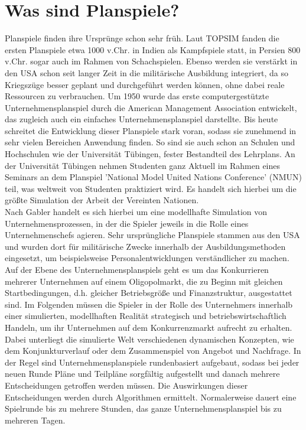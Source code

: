 \section{Was sind Planspiele?}
\label{sec:einleitung-was}

Planspiele finden ihre Ursprünge schon sehr früh. Laut TOPSIM fanden die ersten Planspiele etwa 1000 v.Chr. in Indien als Kampfspiele statt, in Persien 800 v.Chr. sogar auch im Rahmen von Schachspielen.  Ebenso werden sie verstärkt in den USA schon seit langer Zeit in die militärische Ausbildung integriert, da so Kriegszüge besser geplant und durchgeführt werden können, ohne dabei reale Ressourcen zu verbrauchen. Um 1950 wurde das  erste computergestützte Unternehmensplanspiel durch die American Management Association entwickelt, das zugleich auch ein einfaches Unternehmensplanspiel darstellte. Bis heute schreitet die Entwicklung dieser Planspiele stark voran, sodass sie zunehmend in sehr vielen Bereichen Anwendung finden. So sind sie auch schon an Schulen und Hochschulen wie der Universität Tübingen, fester Bestandteil des Lehrplans. An der Universität Tübingen nehmen Studenten ganz Aktuell im Rahmen eines Seminars an dem Planspiel 'National Model United Nations Conference' (NMUN) teil, was weltweit von Studenten praktiziert wird. Es handelt sich hierbei um die größte Simulation der Arbeit der Vereinten Nationen.
\\ 
Nach Gabler handelt es sich hierbei um eine modellhafte Simulation von Unternehmensprozessen, in der die Spieler jeweils in die Rolle eines Unternehmenschefs agieren. Sehr ursprüngliche Planspiele stammen aus den USA und wurden dort für  militärische Zwecke innerhalb der Ausbildungsmethoden eingesetzt, um beispielsweise Personalentwicklungen verständlicher zu machen. 
\\
Auf der Ebene des Unternehmensplanspiels geht es um das Konkurrieren mehrerer Unternehmen auf einem Oligopolmarkt, die zu Beginn mit gleichen Startbedingungen, d.h. gleicher Betriebsgröße und Finanzstruktur, ausgestattet sind. Im Folgenden müssen die Spieler in der Rolle des Unternehmers innerhalb einer simulierten, modellhaften Realität strategisch und betriebswirtschaftlich Handeln, um ihr Unternehmen auf dem Konkurrenzmarkt aufrecht zu erhalten. Dabei  unterliegt die simulierte Welt verschiedenen dynamischen Konzepten, wie dem Konjunkturverlauf oder dem Zusammenspiel von Angebot und Nachfrage. In der Regel sind Unternehmensplanspiele rundenbasiert aufgebaut, sodass bei jeder neuen Runde Pläne und Teilpläne sorgfältig aufgestellt und danach mehrere Entscheidungen getroffen werden müssen. Die Auswirkungen dieser Entscheidungen werden durch Algorithmen ermittelt. Normalerweise dauert eine Spielrunde bis zu mehrere Stunden, das ganze Unternehmensplanspiel bis zu mehreren Tagen.
